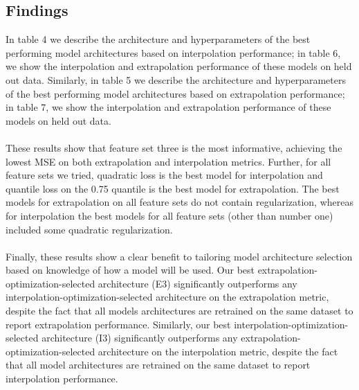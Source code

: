 \documentclass{article}
\begin{document}
\subsection{Findings}
In table 4 we describe the architecture and hyperparameters of the best performing model architectures based on interpolation performance; in table 6, we show the interpolation and extrapolation performance of these models on held out data. Similarly, in table 5 we describe the architecture and hyperparameters of the best performing model architectures based on extrapolation performance; in table 7, we show the interpolation and extrapolation performance of these models on held out data. \\\\
These results show that feature set three is the most informative, achieving the lowest MSE on both extrapolation and interpolation metrics. Further, for all feature sets we tried, quadratic loss is the best model for interpolation and quantile loss on the 0.75 quantile is the best model for extrapolation. The best models for extrapolation on all feature sets do not contain regularization, whereas for interpolation the best models for all feature sets (other than number one) included some quadratic regularization. \\\\
Finally, these results show a clear benefit to tailoring model architecture selection based on knowledge of how a model will be used. Our best extrapolation-optimization-selected architecture (E3) significantly outperforms any interpolation-optimization-selected architecture on the extrapolation metric, despite the fact that all models architectures are retrained on the same dataset to report extrapolation performance. Similarly, our best interpolation-optimization-selected architecture (I3) significantly outperforms any extrapolation-optimization-selected architecture on the interpolation metric, despite the fact that all model architectures are retrained on the same dataset to report interpolation performance.
\end{document}
